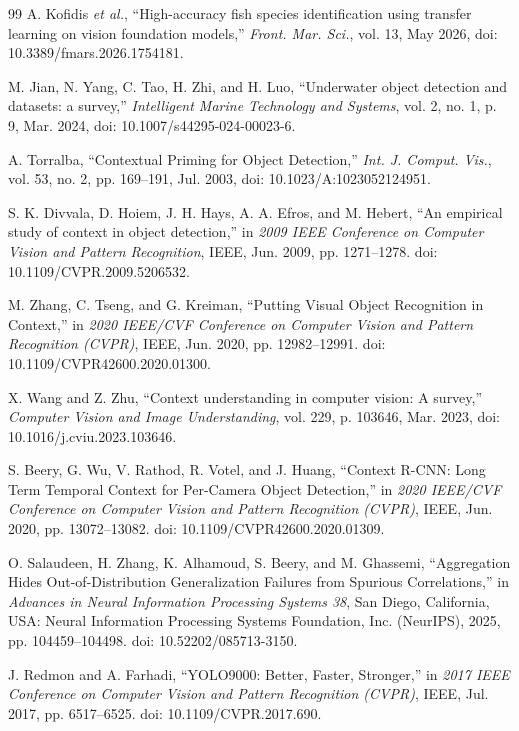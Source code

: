 \documentclass[preprint,12pt]{elsarticle}
\begin{document}
\begin{thebibliography}{99}
 A. Kofidis \emph{et al.}, ``High-accuracy fish species
identification using transfer learning on vision foundation models,''
\emph{Front. Mar. Sci.}, vol. 13, May 2026, doi:
10.3389/fmars.2026.1754181.

 M. Jian, N. Yang, C. Tao, H. Zhi, and H. Luo, ``Underwater
object detection and datasets: a survey,'' \emph{Intelligent Marine
Technology and Systems}, vol. 2, no. 1, p. 9, Mar. 2024, doi:
10.1007/s44295-024-00023-6.

 A. Torralba, ``Contextual Priming for Object Detection,''
\emph{Int. J. Comput. Vis.}, vol. 53, no. 2, pp. 169--191, Jul. 2003,
doi: 10.1023/A:1023052124951.

 S. K. Divvala, D. Hoiem, J. H. Hays, A. A. Efros, and M.
Hebert, ``An empirical study of context in object detection,'' in
\emph{2009 IEEE Conference on Computer Vision and Pattern Recognition},
IEEE, Jun. 2009, pp. 1271--1278. doi: 10.1109/CVPR.2009.5206532.

 M. Zhang, C. Tseng, and G. Kreiman, ``Putting Visual Object
Recognition in Context,'' in \emph{2020 IEEE/CVF Conference on Computer
Vision and Pattern Recognition (CVPR)}, IEEE, Jun. 2020, pp.
12982--12991. doi: 10.1109/CVPR42600.2020.01300.

 X. Wang and Z. Zhu, ``Context understanding in computer vision:
A survey,'' \emph{Computer Vision and Image Understanding}, vol. 229, p.
103646, Mar. 2023, doi: 10.1016/j.cviu.2023.103646.

 S. Beery, G. Wu, V. Rathod, R. Votel, and J. Huang, ``Context
R-CNN: Long Term Temporal Context for Per-Camera Object Detection,'' in
\emph{2020 IEEE/CVF Conference on Computer Vision and Pattern
Recognition (CVPR)}, IEEE, Jun. 2020, pp. 13072--13082. doi:
10.1109/CVPR42600.2020.01309.

 O. Salaudeen, H. Zhang, K. Alhamoud, S. Beery, and M. Ghassemi,
``Aggregation Hides Out-of-Distribution Generalization Failures from
Spurious Correlations,'' in \emph{Advances in Neural Information
Processing Systems 38}, San Diego, California, USA: Neural Information
Processing Systems Foundation, Inc. (NeurIPS), 2025, pp. 104459--104498.
doi: 10.52202/085713-3150.

 J. Redmon and A. Farhadi, ``YOLO9000: Better, Faster,
Stronger,'' in \emph{2017 IEEE Conference on Computer Vision and Pattern
Recognition (CVPR)}, IEEE, Jul. 2017, pp. 6517--6525. doi:
10.1109/CVPR.2017.690.


\end{thebibliography}
\end{document}
